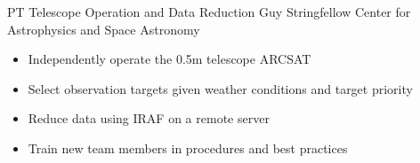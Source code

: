 {PT} %
{Telescope Operation and Data Reduction} %
{Guy Stringfellow} %
{Center for Astrophysics and Space Astronomy}
{\begin{itemize}
\setlength\itemsep{0.1em}
\item Independently operate the 0.5m telescope ARCSAT
\item Select observation targets given weather conditions and target priority
\item Reduce data using IRAF on a remote server
\item Train new team members in procedures and best practices
\end{itemize}
}